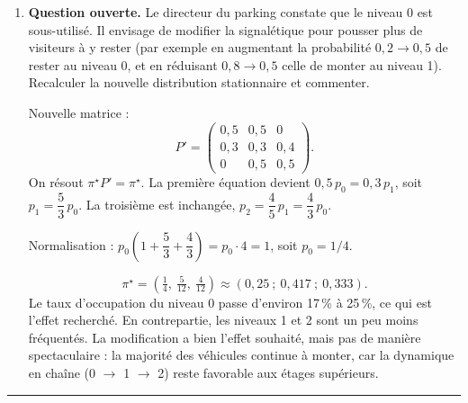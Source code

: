\begin{enumerate}[label=\alph*), itemsep=0.6em]
\begin{solution}
Comme $P$ est stochastique, chaque ligne somme à 1, donc $P\begin{pmatrix} 1 \\ 1 \\ 1 \end{pmatrix} = \begin{pmatrix} 1 \\ 1 \\ 1 \end{pmatrix}$. Le vecteur $(1, 1, 1)^\top$ est vecteur propre à droite associé à la valeur propre $\lambda = 1$.
\end{solution}

  \item \textbf{Question ouverte.} Le directeur du parking constate que le niveau 0 est sous-utilisé. Il envisage de modifier la signalétique pour pousser plus de visiteurs à y rester (par exemple en augmentant la probabilité $0{,}2 \to 0{,}5$ de rester au niveau 0, et en réduisant $0{,}8 \to 0{,}5$ celle de monter au niveau 1). Recalculer la nouvelle distribution stationnaire et commenter.

\begin{solution}
Nouvelle matrice :
\[
  P' = \begin{pmatrix}
    0{,}5 & 0{,}5 & 0 \\
    0{,}3 & 0{,}3 & 0{,}4 \\
    0 & 0{,}5 & 0{,}5
  \end{pmatrix}.
\]
On résout $\pi^\star P' = \pi^\star$. La première équation devient $0{,}5\, p_0 = 0{,}3\, p_1$, soit $p_1 = \dfrac{5}{3}\, p_0$. La troisième est inchangée, $p_2 = \dfrac{4}{5}\, p_1 = \dfrac{4}{3}\, p_0$.

Normalisation : $p_0 \left(1 + \dfrac{5}{3} + \dfrac{4}{3}\right) = p_0 \cdot 4 = 1$, soit $p_0 = 1/4$.

\[
  \pi^\star = \left( \tfrac{1}{4},\ \tfrac{5}{12},\ \tfrac{4}{12} \right) \approx (0{,}25\ ;\ 0{,}417\ ;\ 0{,}333).
\]
Le taux d'occupation du niveau 0 passe d'environ 17\,\% à 25\,\%, ce qui est l'effet recherché. En contrepartie, les niveaux 1 et 2 sont un peu moins fréquentés. La modification a bien l'effet souhaité, mais pas de manière spectaculaire : la majorité des véhicules continue à monter, car la dynamique en chaîne (0 $\to$ 1 $\to$ 2) reste favorable aux étages supérieurs.
\end{solution}
\end{enumerate}


\vspace{1.5em}
\hrule
\vspace{2em}
\newpage

